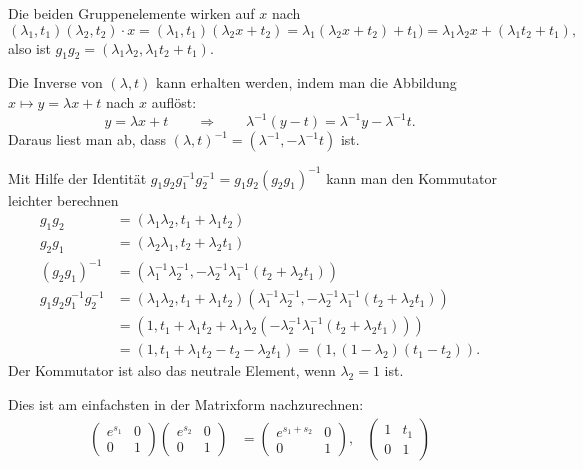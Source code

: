 \begin{loesung}
\begin{teilaufgaben}
\item
Die beiden Gruppenelemente wirken auf $x$ nach
\[
(\lambda_1,t_1)
(\lambda_2,t_2)
\cdot
x
=
(\lambda_1,t_1)(\lambda_2x+t_2)
=
\lambda_1(\lambda_2x+t_2)+t_1)
=
\lambda_1\lambda_2 x + (\lambda_1t_2+t_1),
\]
also ist $g_1g_2=(\lambda_1\lambda_2,\lambda_1t_2+t_1)$.
\item
Die Inverse von $(\lambda,t)$ kann erhalten werden, indem man die
Abbildung $x\mapsto y=\lambda x +t$ nach $x$ auflöst:
\[
y=\lambda x+t
\qquad\Rightarrow\qquad
\lambda^{-1}(y-t)
=
\lambda^{-1}y - \lambda^{-1}t.
\]
Daraus liest man ab, dass $(\lambda,t)^{-1}=(\lambda^{-1},-\lambda^{-1}t)$
ist.
\item
Mit Hilfe der Identität $g_1g_2g_1^{-1}g_2^{-1}=g_1g_2(g_2g_1)^{-1}$
kann man den Kommutator leichter berechnen
\begin{align*}
g_1g_2&=(\lambda_1\lambda_2,t_1+\lambda_1t_2)
\\
g_2g_1&= (\lambda_2\lambda_1,t_2+\lambda_2t_1)
\\
(g_2g_1)^{-1}
&=
(\lambda_1^{-1}\lambda_2^{-1},
	-\lambda_2^{-1}\lambda_1^{-1}(t_2+\lambda_2t_1))
\\
g_1g_2g_1^{-1}g_2^{-1}
&=
(\lambda_1\lambda_2,t_1+\lambda_1t_2)
(\lambda_1^{-1}\lambda_2^{-1},
	-\lambda_2^{-1}\lambda_1^{-1}(t_2+\lambda_2t_1))
\\
&=(1,t_1+\lambda_1t_2 + \lambda_1\lambda_2(
	-\lambda_2^{-1}\lambda_1^{-1}(t_2+\lambda_2t_1))
)
\\
&=(1, t_1+\lambda_1t_2 - t_2 -\lambda_2t_1)
=
(1,(1-\lambda_2)(t_1-t_2)).
\end{align*}
Der Kommutator ist also das neutrale Element, wenn $\lambda_2=1$ ist.
\item
Dies ist am einfachsten in der Matrixform nachzurechnen:
\begin{align*}
\begin{pmatrix} e^{s_1}&0\\0&1\end{pmatrix}
\begin{pmatrix} e^{s_2}&0\\0&1\end{pmatrix}
&=
\begin{pmatrix}e^{s_1+s_2}&0\\0&1\end{pmatrix},
&
\begin{pmatrix} 1&t_1\\0&1\end{pmatrix}

\end{align*}
\end{teilaufgaben}
\end{loesung}
